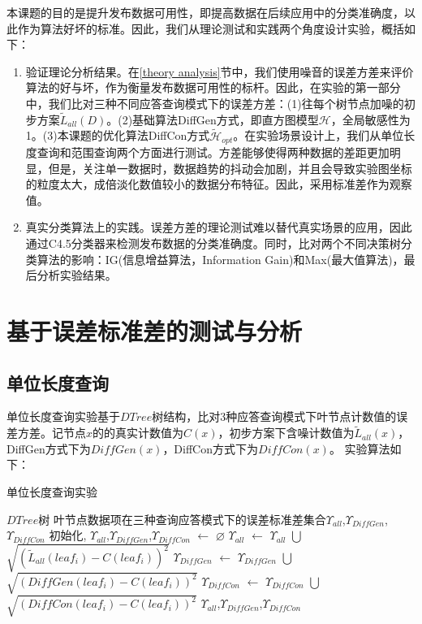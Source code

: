 本课题的目的是提升发布数据可用性，即提高数据在后续应用中的分类准确度，以此作为算法好坏的标准。因此，我们从理论测试和实践两个角度设计实验，概括如下：
\begin{enumerate}
	\item 验证理论分析结果。在\ref{theory analysis}节中，我们使用噪音的误差方差来评价算法的好与坏，作为衡量发布数据可用性的标杆。因此，在实验的第一部分中，我们比对三种不同应答查询模式下的误差方差：(1)往每个树节点加噪的初步方案$\tilde{L}_{all}(D)$。(2)基础算法DiffGen方式，即直方图模型$\mathcal{H}$，全局敏感性为1。(3)本课题的优化算法DiffCon方式$\tilde{\mathcal{H}}_{opt}$。在实验场景设计上，我们从单位长度查询和范围查询两个方面进行测试。方差能够使得两种数据的差距更加明显，但是，关注单一数据时，数据趋势的抖动会加剧，并且会导致实验图坐标的粒度太大，成倍淡化数值较小的数据分布特征。因此，采用标准差作为观察值。
	\item 真实分类算法上的实践。误差方差的理论测试难以替代真实场景的应用，因此通过C4.5分类器\cite{C45}来检测发布数据的分类准确度。同时，比对两个不同决策树分类算法的影响：IG(信息增益算法，Information Gain)和Max\cite{max}(最大值算法)，最后分析实验结果。
\end{enumerate}	

\section{基于误差标准差的测试与分析}

\subsection{单位长度查询} 

单位长度查询实验基于$DTree$树结构，比对3种应答查询模式下叶节点计数值的误差方差。记节点$x$的的真实计数值为$C(x)$，初步方案下含噪计数值为$\tilde{L}_{all}(x)$，DiffGen方式下为$DiffGen(x)$，DiffCon方式下为$DiffCon(x)$。
实验算法如下：
\begin{algorithm}[H]
	\caption{单位长度查询实验}
	\begin{algorithmic}[1]
		\REQUIRE $DTree$树
		\ENSURE 叶节点数据项在三种查询应答模式下的误差标准差集合$\Upsilon_{all}$,$\Upsilon_{DiffGen}$,$\Upsilon_{DiffCon}$
		初始化, $\Upsilon_{all}$,$\Upsilon_{DiffGen}$,$\Upsilon_{DiffCon}$ $\leftarrow$ $\varnothing$
		\STATE $\Upsilon_{all}$ $\leftarrow$ $\Upsilon_{all}$ $\bigcup$ $\sqrt {(\tilde{L}_{all}(leaf_{i})-C(leaf_{i}))^2}$
		\STATE $\Upsilon_{DiffGen}$ $\leftarrow$ $\Upsilon_{DiffGen}$ $\bigcup$ $\sqrt {(DiffGen(leaf_{i})-C(leaf_{i}))^2}$
		\STATE $\Upsilon_{DiffCon}$ $\leftarrow$ $\Upsilon_{DiffCon}$ $\bigcup$ $\sqrt {(DiffCon(leaf_{i})-C(leaf_{i}))^2}$
		\ENDFOR
		\RETURN $\Upsilon_{all}$,$\Upsilon_{DiffGen}$,$\Upsilon_{DiffCon}$
	\end{algorithmic}
\end{algorithm}


